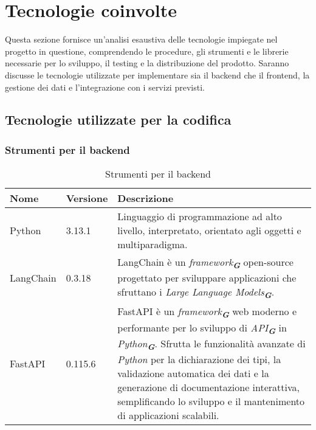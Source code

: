 

\section{Tecnologie coinvolte}
\label{sec:tecnologie_coinvolte}

Questa sezione fornisce un’analisi esaustiva delle tecnologie impiegate nel progetto in questione, comprendendo le procedure, gli
strumenti e le librerie necessarie per lo sviluppo, il testing e la distribuzione del prodotto. Saranno discusse le tecnologie
utilizzate per implementare sia il backend che il frontend, la gestione dei dati e l’integrazione con i servizi previsti.


\subsection{Tecnologie utilizzate per la codifica}

\subsubsection{Strumenti per il backend}
\label{subsec:strumenti_backend}
\begin{table}[h!]
    \centering
    \renewcommand{\arraystretch}{1.6} %
    \begin{tabularx}{\textwidth}{|p{2cm}|p{2cm}|X|} \hline
    \rowcolor[HTML]{FFD700} 
    \textbf{Nome} & \textbf{Versione} & \textbf{Descrizione} \\ 
    \hline
    Python & 3.13.1 & Linguaggio di programmazione ad alto livello, interpretato,
    orientato agli oggetti e multiparadigma. \\ 
    \hline
    LangChain & 0.3.18 & LangChain è un \emph{framework}\textsubscript{\textbf{\textit{G}}} open-source progettato per sviluppare
    applicazioni che sfruttano i \emph{Large Language Models}\textsubscript{\textbf{\textit{G}}}. \\ 
    \hline
    FastAPI & 0.115.6 & FastAPI è un \emph{framework}\textsubscript{\textbf{\textit{G}}} web moderno e performante per lo sviluppo di \emph{API}\textsubscript{\textbf{\textit{G}}} in \emph{Python}\textsubscript{\textbf{\textit{G}}}. 
    Sfrutta le funzionalità avanzate di \emph{Python} per la dichiarazione dei tipi, la validazione automatica dei dati e la generazione di documentazione interattiva, semplificando lo sviluppo e il mantenimento di applicazioni scalabili. \\ 
    \hline
    \end{tabularx}
    \caption{Strumenti per il backend}
\end{table}

